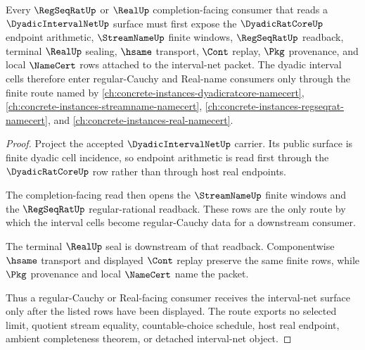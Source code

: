 \begin{theorem}
\label{thm:dyadic-interval-net-regular-cauchy-consumer-route}
Every $\RegSeqRatUp$ or $\RealUp$ completion-facing consumer that reads a $\DyadicIntervalNetUp$ surface must first expose the $\DyadicRatCoreUp$ endpoint arithmetic, $\StreamNameUp$ finite windows, $\RegSeqRatUp$ readback, terminal $\RealUp$ sealing, $\hsame$ transport, $\Cont$ replay, $\Pkg$ provenance, and local $\NameCert$ rows attached to the interval-net packet. The dyadic interval cells therefore enter regular-Cauchy and Real-name consumers only through the finite route named by \autoref{ch:concrete-instances-dyadicratcore-namecert}, \autoref{ch:concrete-instances-streamname-namecert}, \autoref{ch:concrete-instances-regseqrat-namecert}, and \autoref{ch:concrete-instances-real-namecert}.
\end{theorem}
\begin{proof}
Project the accepted $\DyadicIntervalNetUp$ carrier. Its public surface is finite dyadic cell incidence, so endpoint arithmetic is read first through the $\DyadicRatCoreUp$ row rather than through host real endpoints.

The completion-facing read then opens the $\StreamNameUp$ finite windows and the $\RegSeqRatUp$ regular-rational readback. These rows are the only route by which the interval cells become regular-Cauchy data for a downstream consumer.

The terminal $\RealUp$ seal is downstream of that readback. Componentwise $\hsame$ transport and displayed $\Cont$ replay preserve the same finite rows, while $\Pkg$ provenance and local $\NameCert$ name the packet.

Thus a regular-Cauchy or Real-facing consumer receives the interval-net surface only after the listed rows have been displayed. The route exports no selected limit, quotient stream equality, countable-choice schedule, host real endpoint, ambient completeness theorem, or detached interval-net object.
\end{proof}
